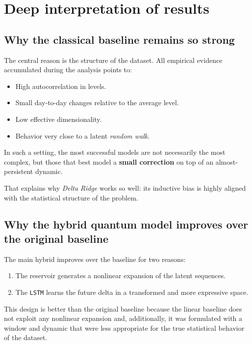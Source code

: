 \documentclass[11pt,a4paper]{article}
\begin{document}
\section{Deep interpretation of results}

\subsection{Why the classical baseline remains so strong}

The central reason is the structure of the dataset. All empirical evidence accumulated during the analysis points to:

\begin{itemize}
    \item High autocorrelation in levels.
    \item Small day-to-day changes relative to the average level.
    \item Low effective dimensionality.
    \item Behavior very close to a latent \textit{random walk}.
\end{itemize}

In such a setting, the most successful models are not necessarily the most complex, but those that best model a \textbf{small correction} on top of an almost-persistent dynamic.

That explains why \textit{Delta Ridge} works so well: its inductive bias is highly aligned with the statistical structure of the problem.

\subsection{Why the hybrid quantum model improves over the original baseline}

The main hybrid improves over the baseline for two reasons:

\begin{enumerate}[label=\arabic*.]
    \item The reservoir generates a nonlinear expansion of the latent sequences.
    \item The \texttt{LSTM} learns the future delta in a transformed and more expressive space.
\end{enumerate}

This design is better than the original baseline because the linear baseline does not exploit any nonlinear expansion and, additionally, it was formulated with a window and dynamic that were less appropriate for the true statistical behavior of the dataset.
\end{document}
